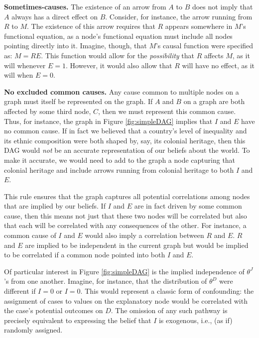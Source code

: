 \documentclass[
  12pt,
]{book}
\begin{document}
\textbf{Sometimes-causes.} The existence of an arrow from \(A\) to \(B\) does not imply that \(A\) always has a direct effect on \(B\). Consider, for instance, the arrow running from \(R\) to \(M\). The existence of this arrow requires that \(R\) appears somewhere in \(M\)'s functional equation, as a node's functional equation must include all nodes pointing directly into it. Imagine, though, that \(M\)'s causal function were specified as: \(M = RE\). This function would allow for the \emph{possibility} that \(R\) affects \(M\), as it will whenever \(E=1\). However, it would also allow that \(R\) will have no effect, as it will when \(E=0\).

\textbf{No excluded common causes.} Any cause common to multiple nodes on a graph must itself be represented on the graph. If \(A\) and \(B\) on a graph are both affected by some third node, \(C\), then we must represent this common cause. Thus, for instance, the graph in Figure \ref{fig:simpleDAG} implies that \(I\) and \(E\) have no common cause. If in fact we believed that a country's level of inequality and its ethnic composition were both shaped by, say, its colonial heritage, then this DAG would \emph{not} be an accurate representation of our beliefs about the world. To make it accurate, we would need to add to the graph a node capturing that colonial heritage and include arrows running from colonial heritage to both \(I\) and \(E\).

This rule ensures that the graph captures all potential correlations among nodes that are implied by our beliefs. If \(I\) and \(E\) are in fact driven by some common cause, then this means not just that these two nodes will be correlated but also that each will be correlated with any consequences of the other. For instance, a common cause of \(I\) and \(E\) would also imply a correlation between \(R\) and \(E\). \(R\) and \(E\) are implied to be independent in the current graph but would be implied to be correlated if a common node pointed into both \(I\) and \(E\).

Of particular interest in Figure \ref{fig:simpleDAG} is the implied independence of \(\theta^J\)'s from one another. Imagine, for instance, that the distribution of \(\theta^D\) were different if \(I=0\) or \(I=0\). This would represent a classic form of confounding: the assignment of cases to values on the explanatory node would be correlated with the case's potential outcomes on \(D\). The omission of any such pathway is precisely equivalent to expressing the belief that \(I\) is exogenous, i.e., (as if) randomly assigned.
\end{document}
